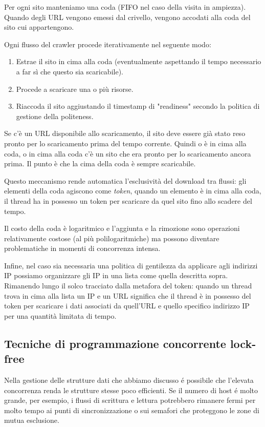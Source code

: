 Per ogni sito manteniamo una coda (FIFO nel caso della visita in ampiezza). Quando degli URL vengono emessi dal crivello, vengono accodati alla coda del sito cui appartengono.

Ogni flusso del crawler procede iterativamente nel seguente modo:
\begin{enumerate}
    \item Estrae il sito in cima alla coda (eventualmente aspettando il tempo necessario a far sì che questo sia scaricabile).
    \item Procede a scaricare una o più risorse.
    \item Riaccoda il sito aggiustando il timestamp di "readiness" secondo la politica di gestione della politeness.
\end{enumerate}
Se c'è un URL disponibile allo scaricamento, il sito deve essere già stato reso pronto per lo scaricamento prima del tempo corrente. Quindi o è in cima alla coda, o in cima alla coda c'è un sito che era pronto per lo scaricamento ancora prima. Il punto è che la cima della coda è sempre scaricabile.

Questo meccanismo rende automatica l'esclusività del download tra flussi: gli elementi della coda agiscono come \textit{token}, quando un elemento è in cima alla coda, il thread ha in possesso un token per scaricare da quel sito fino allo scadere del tempo.

Il costo della coda è logaritmico e l'aggiunta e la rimozione sono operazioni relativamente costose (al più polilogaritmiche) ma possono diventare problematiche in momenti di concorrenza intensa.

Infine, nel caso sia necessaria una politica di gentilezza da applicare agli indirizzi IP possiamo organizzare gli IP in una lista come quella descritta sopra. Rimanendo lungo il solco tracciato dalla metafora del token: quando un thread trova in cima alla lista un IP e un URL significa che il thread è in possesso del token per scaricare i dati associati da quell'URL e quello specifico indirizzo IP per una quantità limitata di tempo.
\subsection{Tecniche di programmazione concorrente lock-free}
Nella gestione delle strutture dati che abbiamo discusso é possibile che l'elevata concorrenza renda le strutture stesse poco efficienti. Se il numero di host é molto grande, per esempio, i flussi di scrittura e lettura potrebbero rimanere fermi per molto tempo ai punti di sincronizzazione o sui semafori che proteggono le zone di mutua esclusione.

